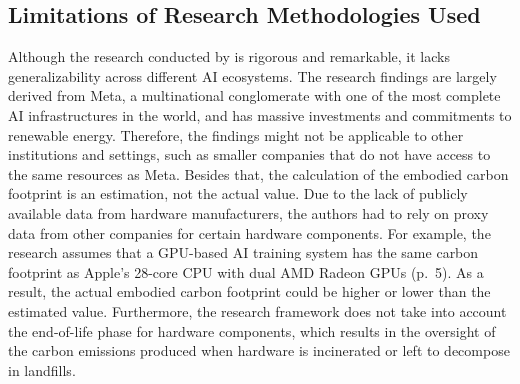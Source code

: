 \documentclass[a4paper, 12pt]{article}
\begin{document}
\subsection{Limitations of Research Methodologies Used}
Although the research conducted by \citet{Wu2022} is rigorous and remarkable, it lacks generalizability across different AI ecosystems. The research findings are largely derived from Meta, a multinational conglomerate with one of the most complete AI infrastructures in the world, and has massive investments and commitments to renewable energy. Therefore, the findings might not be applicable to other institutions and settings, such as smaller companies that do not have access to the same resources as Meta. Besides that, the calculation of the embodied carbon footprint is an estimation, not the actual value. Due to the lack of publicly available data from hardware manufacturers, the authors had to rely on proxy data from other companies for certain hardware components. For example, the research assumes that a GPU-based AI training system has the same carbon footprint as Apple's 28-core CPU with dual AMD Radeon GPUs (p.~5). As a result, the actual embodied carbon footprint could be higher or lower than the estimated value. Furthermore, the research framework does not take into account the end-of-life phase for hardware components, which results in the oversight of the carbon emissions produced when hardware is incinerated or left to decompose in landfills.\hfill \break
\end{document}

